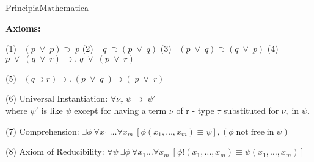 \calculusAcronym{}         





\maketitle


\begin{entry}{PrincipiaMathematica}  




\begin{calculus}

\begin{center}

\textbf{Axioms:}

(1) \ $( p\; {\scriptstyle \vee} \;  p )  \supset  \;  p $ 
\qquad
(2) \ $\; q \;  \supset (  p \;  {\scriptstyle \vee} \; q ) $ 
\qquad
(3) \ $( p \;  {\scriptstyle \vee} \; q  ) \supset ( q \;  {\scriptstyle \vee} \; p )  $ 
\qquad
(4) \ $p \;  {\scriptstyle \vee} \; (q \;  {\scriptstyle \vee} \;r ) \;  \supset . \; q \;  {\scriptstyle \vee} \; (p \;  {\scriptstyle \vee} \;r  )   $

\smallskip

(5) \ $( q \supset r    )  \supset . \; (p \;  {\scriptstyle \vee} \; q \; ) \supset (\; p \;  {\scriptstyle \vee} \; r ) $ 

\smallskip

(6) Universal Instantiation: 
$ \forall \nu_{\tau} \; \psi \; \supset \;  \psi '$ \\ where $\psi '$ is like $\psi$ except for having a term $\nu$ of r - type $\tau$ substituted for $\nu_{\tau}$ in $\psi$.

\smallskip

(7) Comprehension: $\exists \phi \: \forall x_1 \: \ldots \forall x_m \: [ \phi (x_1, \ldots , x_m) \equiv \psi], (\phi \mathrm{\; not \; free \; in\; } \psi)$

\smallskip

(8) Axiom of Reducibility: $ \forall \psi \: \exists \phi \: \forall x_1 \ldots \forall x_m \: [ \phi ! (x_1, \ldots , x_m) \equiv \psi  (x_1, \ldots , x_m)]$


\medskip


\end{center}
\end{calculus}
\end{entry}
